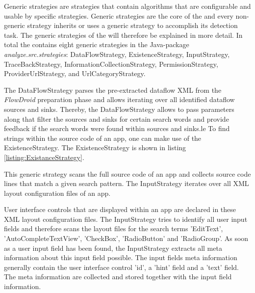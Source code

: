 Generic strategies are strategies that contain algorithms that are configurable and usable by specific strategies.
Generic strategies are the core of the \aiprat and every non-generic strategy inherits or uses a generic strategy to accomplish its \ipr detection task.
The generic strategies of the \aiprat will therefore be explained in more detail.
In total the \aiprat contains eight generic strategies in the Java-package \textit{analyze.src.strategies}: DataFlowStrategy, ExistenceStrategy, InputStrategy, TraceBackStrategy, InformationCollectionStrategy, PermissionStrategy, ProviderUrlStrategy, and UrlCategoryStrategy.

The DataFlowStrategy parses the pre-extracted dataflow \acs{XML} from the \textit{FlowDroid} preparation phase and allows iterating over all identified dataflow sources and sinks.
Thereby, the DataFlowStrategy allows to pass parameters along that filter the sources and sinks for certain search words and provide feedback if the search words were found within sources and sinks.le
To find strings within the source code of an app, one can make use of the ExistenceStrategy.
The ExistenceStrategy is shown in listing \ref{listing:ExistanceStrategy}.
 
This generic strategy scans the full source code of an app and collects source code lines that match a given search pattern.
The InputStrategy iterates over all \acs{XML} layout configuration files of an app. 

User interface controls that are displayed within an app are declared in these \acs{XML} layout configuration files.
The InputStrategy tries to identify all user input fields and therefore scans the layout files for the search terms 'EditText', 'AutoCompleteTextView', 'CheckBox', 'RadioButton' and 'RadioGroup'.
As soon as a user input field has been found, the InputStrategy extracts all meta information about this input field possible.
The input fields meta information generally contain the user interface control 'id', a 'hint' field and a 'text' field. 
The meta information are collected and stored together with the input field information.
